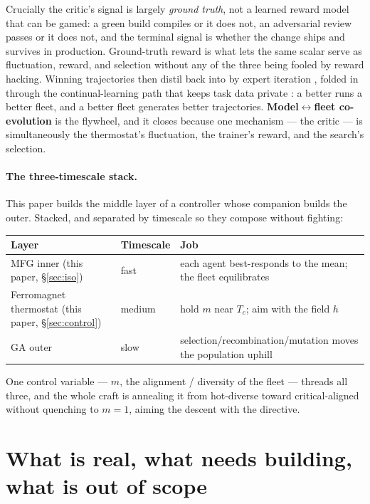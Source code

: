 \documentclass[11pt]{article}
\begin{document}
Crucially the critic's signal is largely \emph{ground truth}, not a learned reward model that can be gamed: a
green build compiles or it does not, an adversarial review passes or it does not, and the terminal signal is
whether the change ships and survives in production. Ground-truth reward is what lets the same scalar serve as
fluctuation, reward, and selection without any of the three being fooled by reward hacking. Winning
trajectories then distil back into  by expert iteration \cite{hanzo-native-training}, folded in
through the continual-learning path that keeps task data private \cite{hanzo-continuous-learning-privacy}: a
better  runs a better fleet, and a better fleet generates better trajectories.
\textbf{Model$\leftrightarrow$fleet co-evolution} is the flywheel, and it closes because one mechanism --- the
critic --- is simultaneously the thermostat's fluctuation, the trainer's reward, and the search's selection.

\paragraph{The three-timescale stack.} This paper builds the middle layer of a controller whose companion
\cite{hanzo-evolutionary-orchestration} builds the outer. Stacked, and separated by timescale so they compose
without fighting:
\begin{center}
\begin{tabular}{@{}lll@{}}
\toprule
\textbf{Layer} & \textbf{Timescale} & \textbf{Job} \\
\midrule
MFG inner (this paper, \S\ref{sec:iso}) & fast & each agent best-responds to the mean; the fleet equilibrates \\
Ferromagnet thermostat (this paper, \S\ref{sec:control}) & medium & hold $m$ near $T_c$; aim with the field $h$ \\
GA outer \cite{hanzo-evolutionary-orchestration} & slow & selection/recombination/mutation moves the population uphill \\
\bottomrule
\end{tabular}
\end{center}
One control variable --- $m$, the alignment / diversity of the fleet --- threads all three, and the whole craft
is annealing it from hot-diverse toward critical-aligned without quenching to $m=1$, aiming the descent with the
directive.

\section{What is real, what needs building, what is out of scope}
\label{sec:status}
\end{document}
